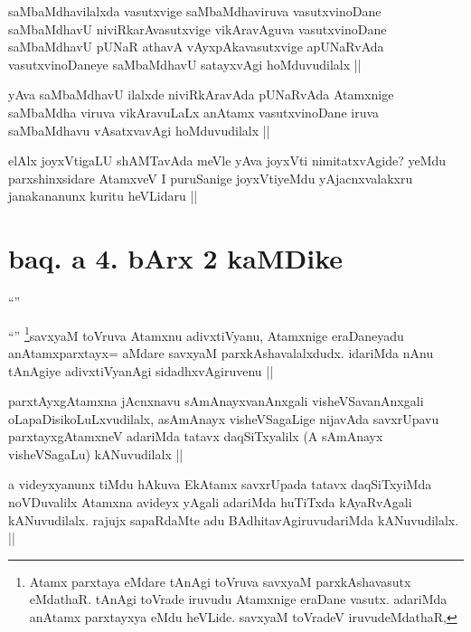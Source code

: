 \begin{artha}
saMbaMdhavilalxda vasutxvige saMbaMdhaviruva vasutxvinoDane saMbaMdhavU niviRkarAvasutxvige vikAravAguva vasutxvinoDane saMbaMdhavU pUNaR athavA vAyxpAkavasutxvige apUNaRvAda vasutxvinoDaneye saMbaMdhavU satayxvAgi hoMduvudilalx || 

yAva saMbaMdhavU ilalxde niviRkAravAda pUNaRvAda Atamxnige saMbaMdha viruva vikAravuLaLx anAtamx vasutxvinoDane iruva saMbaMdhavu vAsatxvavAgi hoMduvudilalx ||
\end{artha}

\begin{artha}
elAlx joyxVtigaLU shAMTavAda meVle yAva joyxVti nimitatxvAgide? yeMdu parxshinxsidare AtamxveV I puruSanige joyxVtiyeMdu yAjacnxvalakxru janakananunx kuritu heVLidaru ||
\end{artha}

\section*{baq. a 4. bArx 2 kaMDike}
\begin{artha}
``\stext''
\end{artha}

\begin{artha}
``\stext'' \footnote[1]{Atamx parxtaya eMdare tAnAgi toVruva savxyaM parxkAshavasutx eMdathaR. tAnAgi toVrade iruvudu Atamxnige eraDane vasutx. adariMda anAtamx parxtayxya eMdu heVLide. savxyaM toVradeV iruvudeMdathaR,}savxyaM toVruva Atamxnu adivxtiVyanu, Atamxnige eraDaneyadu \footnotemark[1]anAtamxparxtayx= aMdare savxyaM parxkAshavalalxdudx. idariMda nAnu tAnAgiye adivxtiVyanAgi sidadhxvAgiruvenu ||
\end{artha}

\begin{artha}
parxtAyxgAtamxna jAcnxnavu sAmAnayxvanAnxgali visheVSavanAnxgali oLapaDisikoLuLxvudilalx, asAmAnayx visheVSagaLige nijavAda savxrUpavu parxtayxgAtamxneV adariMda tatavx daqSiTxyalilx (A sAmAnayx visheVSagaLu) kANuvudilalx ||
\end{artha}

\begin{artha}
a videyxyanunx tiMdu hAkuva EkAtamx savxrUpada tatavx daqSiTxyiMda noVDuvalilx Atamxna avideyx yAgali adariMda huTiTxda kAyaRvAgali kANuvudilalx. rajujx sapaRdaMte adu BAdhitavAgiruvudariMda kANuvudilalx. ||
\end{artha}

